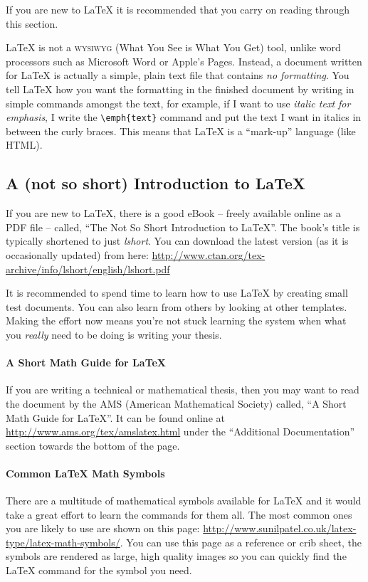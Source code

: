 If you are new to LaTeX it is recommended that you carry on reading through this section.

LaTeX is not a \textsc{wysiwyg} (What You See is What You Get) tool, unlike word processors such as Microsoft Word or Apple's Pages. Instead, a document written for LaTeX is actually a simple, plain text file that contains \emph{no formatting}. You tell LaTeX how you want the formatting in the finished document by writing in simple commands amongst the text, for example, if I want to use \emph{italic text for emphasis}, I write the \verb|\emph{text}| command and put the text I want in italics in between the curly braces. This means that LaTeX is a \enquote{mark-up} language (like HTML).

\subsection{A (not so short) Introduction to LaTeX}

If you are new to LaTeX, there is a good eBook -- freely available online as a PDF file -- called, \enquote{The Not So Short Introduction to LaTeX}. The book's title is typically shortened to just \emph{lshort}. You can download the latest version (as it is occasionally updated) from here:
\url{http://www.ctan.org/tex-archive/info/lshort/english/lshort.pdf}

It is recommended to spend time to learn how to use LaTeX by creating small test documents. You can also learn from others by looking at other templates.
Making the effort now means you're not stuck learning the system when what you \emph{really} need to be doing is writing your thesis.

\paragraph{A Short Math Guide for LaTeX}

If you are writing a technical or mathematical thesis, then you may want to read the document by the AMS (American Mathematical Society) called, \enquote{A Short Math Guide for LaTeX}. It can be found online at
\url{http://www.ams.org/tex/amslatex.html}
under the \enquote{Additional Documentation} section towards the bottom of the page.

\paragraph{Common LaTeX Math Symbols}
There are a multitude of mathematical symbols available for LaTeX and it would take a great effort to learn the commands for them all. The most common ones you are likely to use are shown on this page:
\url{http://www.sunilpatel.co.uk/latex-type/latex-math-symbols/}.
You can use this page as a reference or crib sheet, the symbols are rendered as large, high quality images so you can quickly find the LaTeX command for the symbol you need.

